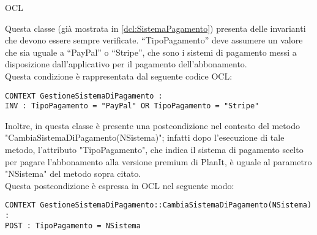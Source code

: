 \begin{listaPersonale}{OCL}
    \begin{center}
        
    \end{center}
    Questa classe (già mostrata in \ref{dcl:SistemaPagamento}) presenta delle invarianti che devono essere sempre verificate. “TipoPagamento” deve assumere un valore che sia uguale a “PayPal” o “Stripe”, che sono i sistemi di pagamento messi a disposizione dall'applicativo per il pagamento dell'abbonamento. \\
    Questa condizione è rappresentata dal seguente codice OCL:
    \begin{lstlisting}
CONTEXT GestioneSistemaDiPagamento :
INV : TipoPagamento = "PayPal" OR TipoPagamento = "Stripe"
    \end{lstlisting}        Inoltre, in questa classe è presente una postcondizione nel contesto del metodo "CambiaSistemaDiPagamento(NSistema)"; infatti dopo l'esecuzione di tale metodo, l'attributo "TipoPagamento", che indica il sistema di pagamento scelto per pagare l'abbonamento alla versione premium di PlanIt, è uguale al parametro "NSistema" del metodo sopra citato. \\
    Questa postcondizione è espressa in OCL nel seguente modo:
    \begin{lstlisting}
CONTEXT GestioneSistemaDiPagamento::CambiaSistemaDiPagamento(NSistema) :
POST : TipoPagamento = NSistema
    \end{lstlisting}





\end{listaPersonale}
